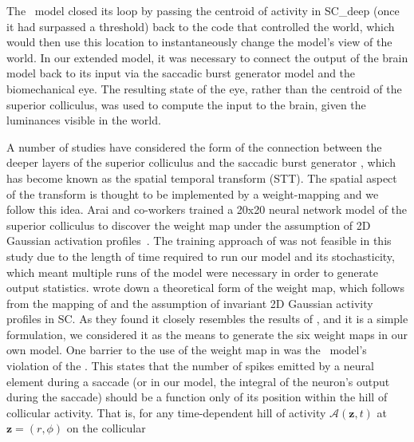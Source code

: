 The \ccg~model closed its loop by passing the centroid of activity in
SC\_deep (once it had surpassed a threshold) back to the code that
controlled the world, which would then use this location to
instantaneously change the model's view of the world. In our extended
model, it was necessary to connect the output of the brain model back
to its input via the saccadic burst generator model and the
biomechanical eye. The resulting state of the eye, rather than the
centroid of the superior colliculus, was used to compute the input to
the brain, given the luminances visible in the world.

A number of studies have considered the form of the connection between
the deeper layers of the superior colliculus and the saccadic burst
generator \citep{van_gisbergen_experimental_1985,ottes_visuomotor_1986,waitzman_superior_1991,groh_converting_2001,arai_two-dimensional_1994,goossens_dynamic_2006,tabareau_geometry_2007,van_opstal_linear_2008,goossens_optimal_2012},
which has become known as the spatial temporal transform (STT).  The
spatial aspect of the transform is thought to be implemented by a
weight-mapping \citep{tabareau_geometry_2007,arai_two-dimensional_1994} and we
follow this idea.
Arai and co-workers trained a 20x20 neural network model of the
superior colliculus to discover the weight map under the assumption of
2D Gaussian activation profiles~\citep{arai_two-dimensional_1994}.
The training approach of \cite{arai_two-dimensional_1994} was not feasible in this study
due to the length of time required to run our model and its
stochasticity, which meant multiple runs of the model were necessary
in order to generate output statistics.
\cite{tabareau_geometry_2007} wrote down a theoretical form of the weight
map, which follows from the mapping of \cite{ottes_visuomotor_1986}
and the assumption of invariant 2D Gaussian activity profiles in
SC. As they found it closely resembles the
results of \cite{arai_two-dimensional_1994}, and it is a simple
formulation, we considered
it as the means to generate the six weight maps in our own model.
One barrier to the use of the weight map
in \cite{tabareau_geometry_2007} was the \ccg~model's violation of the
. This states that the number of spikes
emitted by a neural element during a saccade (or in our model, the
integral of the neuron's output during the saccade) should be a
function only of its position within the hill of collicular
activity. That is, for any time-dependent hill of activity
$\mathcal{A}(\mathbf{z},t)$ at $\mathbf{z} = (r,\phi)$ on the collicular
